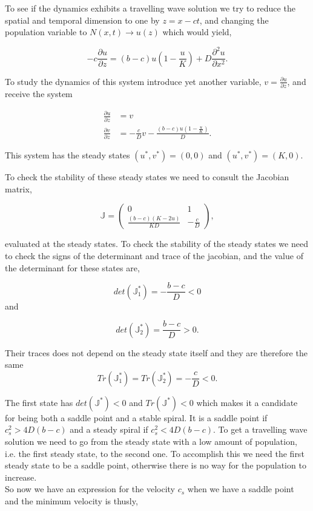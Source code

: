 To see if the dynamics exhibits a travelling wave solution we try to reduce the spatial and temporal dimension to one by $z=x-ct$, and changing the population variable to $N(x,t)\rightarrow u(z)$ which would yield,

\begin{equation}
-c\frac{\partial u}{\partial z}=(b-c)u\left(1-\frac{u}{K}\right)+D\frac{\partial^2 u}{\partial x^2}.
\end{equation}

To study the dynamics of this system introduce yet another variable, $v=\frac{\partial u}{\partial z}$, and receive the system 

\begin{align*}
\frac{\partial u}{\partial z}&=v\\
\frac{\partial v}{\partial z}&=-\frac{c}{D}v-\frac{(b-c)u(1-\frac{u}{K})}{D}.
\end{align*}

This system has the steady states $(u^*,v^*)=(0,0)$ and $(u^*,v^*)=(K,0)$.

To check the stability of these steady states we need to consult the Jacobian matrix,

\begin{equation}
\mathbb{J}=\left(\begin{array}{cc}
0 & 1 \\
  \frac{(b-c)(K-2u)}{KD} & -\frac{c}{D}
\end{array}\right),
\end{equation}

 evaluated at the steady states. To check the stability of the steady states we need to check the signs of the determinant and trace of the jacobian, and the value of the determinant for these states are,
 
 $$
 det(\mathbb{J}^*_1)= -\frac{b-c}{D}<0
 $$
 and
 
 $$
 det(\mathbb{J}^*_2)=\frac{b-c}{D}>0.
 $$
 
 Their traces does not depend on the steady state itself and they are therefore the same 
 $$
 Tr(\mathbb{J}^*_1)=Tr(\mathbb{J}^*_2)=-\frac{c}{D}<0.
 $$
 
The first state has $det(\mathbb{J}^*)<0$ and $Tr(\mathbb{J}^*)<0$ which makes it a candidate for being both a saddle point and a stable spiral. It is a saddle point if $c^2_s>4D(b-c)$ and a steady spiral if $c^2_s<4D(b-c)$. To get a travelling wave solution we need to go from the steady state with a low amount of population, i.e. the first steady state, to the second one. To accomplish this we need the first steady state to be a saddle point, otherwise there is no way for the population to increase.\\
So now we have an expression for the velocity $c_s$ when we have a saddle point and the minimum velocity is thusly,

